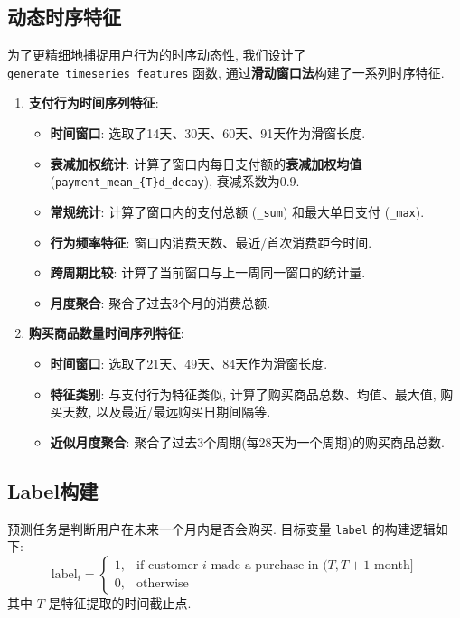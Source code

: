 \documentclass[11pt, a4paper]{article}
\begin{document}
\subsection{动态时序特征}
为了更精细地捕捉用户行为的时序动态性, 我们设计了 \texttt{generate\_timeseries\_features} 函数, 通过\textbf{滑动窗口法}构建了一系列时序特征.
\begin{enumerate}
    \item \textbf{支付行为时间序列特征}:
    \begin{itemize}
        \item \textbf{时间窗口}: 选取了14天、30天、60天、91天作为滑窗长度.
        \item \textbf{衰减加权统计}: 计算了窗口内每日支付额的\textbf{衰减加权均值}(\texttt{payment\_mean\_\{T\}d\_decay}), 衰减系数为0.9.
        \item \textbf{常规统计}: 计算了窗口内的支付总额 (\texttt{\_sum}) 和最大单日支付 (\texttt{\_max}).
        \item \textbf{行为频率特征}: 窗口内消费天数、最近/首次消费距今时间.
        \item \textbf{跨周期比较}: 计算了当前窗口与上一周同一窗口的统计量.
        \item \textbf{月度聚合}: 聚合了过去3个月的消费总额.
    \end{itemize}
    \item \textbf{购买商品数量时间序列特征}:
    \begin{itemize}
        \item \textbf{时间窗口}: 选取了21天、49天、84天作为滑窗长度.
        \item \textbf{特征类别}: 与支付行为特征类似, 计算了购买商品总数、均值、最大值, 购买天数, 以及最近/最远购买日期间隔等.
        \item \textbf{近似月度聚合}: 聚合了过去3个周期(每28天为一个周期)的购买商品总数.
    \end{itemize}
\end{enumerate}

\subsection{Label构建}
预测任务是判断用户在未来一个月内是否会购买. 目标变量 \texttt{label} 的构建逻辑如下:
$$
\text{label}_i = 
\begin{cases} 
    1, & \text{if customer } i \text{ made a purchase in } (T, T + 1\text{ month}] \\
    0, & \text{otherwise} 
\end{cases}
$$
其中 $T$ 是特征提取的时间截止点.
\end{document}
